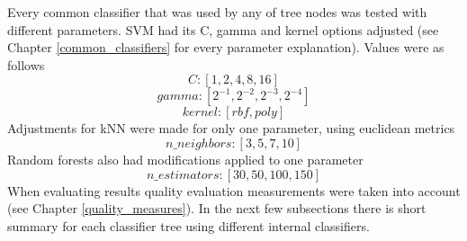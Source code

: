 Every common classifier that was used by any of tree nodes was tested with different parameters. SVM had its C, gamma and kernel options adjusted (see Chapter \ref{common_classifiers} for every parameter explanation). Values were as follows \[ C: [ 1, 2, 4, 8, 16 ] \] \[ gamma: [ 2^{-1}, 2^{-2}, 2^{-3}, 2^{-4} ] \]  \[ kernel: [ rbf, poly ] \] 
Adjustments for kNN were made for only one parameter, using euclidean metrics \[ n\_neighbors: [ 3, 5, 7, 10 ] \]
Random forests also had modifications applied to one parameter \[ n\_estimators: [ 30, 50, 100, 150 ] \]
When evaluating results quality evaluation measurements were taken into account (see Chapter \ref{quality_measures}). In the next few subsections there is short summary for each classifier tree using different internal classifiers.

\begin{table}[htp]
	\centering
	\caption{Measures values (described in Chapter \ref{quality_measures}) for classifier trees using various common classifiers on training data (described in Chapter \ref{datasets})}
	\label{classifier_trees_training_results}
\end{table}

